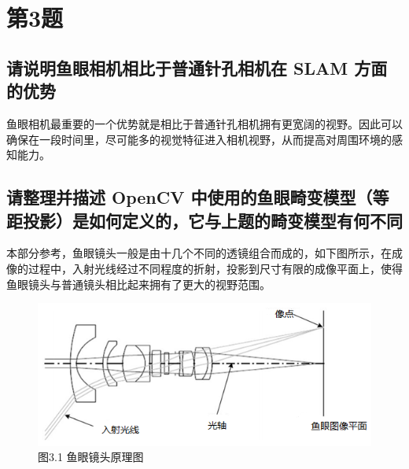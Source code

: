 \documentclass[40pt,a4paper，UTF8]{ctexart}
\numberwithin{equation}{section}
\begin{document}
\paragraph{}




\section{第3题}
\paragraph{}
\subsection{请说明鱼眼相机相比于普通针孔相机在 SLAM 方面的优势}
鱼眼相机最重要的一个优势就是相比于普通针孔相机拥有更宽阔的视野。因此可以确保在一段时间里，尽可能多的视觉特征进入相机视野，从而提高对周围环境的感知能力。

\subsection{请整理并描述 OpenCV 中使用的鱼眼畸变模型（等距投影）是如何定义的，它与上题的畸变模型有何不同}
本部分参考\cite{ref1}，鱼眼镜头一般是由十几个不同的透镜组合而成的，如下图所示，在成像的过程中，入射光线经过不同程度的折射，投影到尺寸有限的成像平面上，使得鱼眼镜头与普通镜头相比起来拥有了更大的视野范围。
\begin{figure}[H]
\centering
\includegraphics[width=4.8in]{ch4_3_2.png} {图3.1 鱼眼镜头原理图}
\end{figure}
\end{document}
